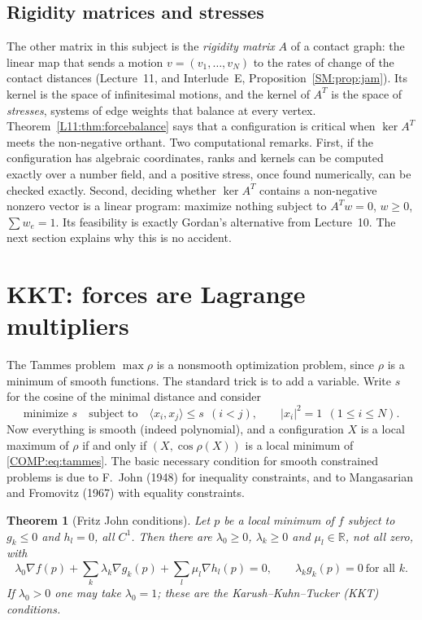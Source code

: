 \documentclass[11pt,openany]{book}
\theoremstyle{plain}
\newtheorem{theorem}{Theorem}[chapter]
\theoremstyle{definition}
\theoremstyle{remark}
\newcommand{\R}{\mathbb{R}}
\newcommand{\abs}[1]{\left\lvert #1 \right\rvert}
\newcommand{\ip}[2]{\langle #1, #2\rangle}
\begin{document}
\subsection{Rigidity matrices and stresses}
The other matrix in this subject is the \emph{rigidity matrix} $A$ of a contact graph: the linear map that
sends a motion $v=(v_1,\dots,v_N)$ to the rates of change of the contact distances (Lecture~11, and
Interlude~E, Proposition~\ref{SM:prop:jam}). Its kernel is the space of infinitesimal motions, and the
kernel of $A^T$ is the space of \emph{stresses}, systems of edge weights that balance at every vertex.
Theorem~\ref{L11:thm:forcebalance} says that a configuration is critical when $\ker A^T$ meets the
non-negative orthant. Two computational remarks. First, if the configuration has algebraic coordinates,
ranks and kernels can be computed exactly over a number field, and a positive stress, once found
numerically, can be checked exactly. Second, deciding whether $\ker A^T$ contains a non-negative nonzero
vector is a linear program: maximize nothing subject to $A^Tw=0$, $w\ge0$, $\sum w_e=1$. Its feasibility
is exactly Gordan's alternative from Lecture~10. The next section explains why this is no accident.

\section{KKT: forces are Lagrange multipliers}
\label{COMP:sec:kkt}

The Tammes problem $\max\rho$ is a nonsmooth optimization problem, since $\rho$ is a minimum of smooth
functions. The standard trick is to add a variable. Write $s$ for the cosine of the minimal distance and
consider
\begin{equation}\label{COMP:eq:tammes}
  \text{minimize } s\quad\text{subject to}\quad \ip{x_i}{x_j}\le s\ \ (i<j),\qquad \abs{x_i}^2=1\ \ (1\le i\le N).
\end{equation}
Now everything is smooth (indeed polynomial), and a configuration $X$ is a local maximum of $\rho$ if and
only if $(X,\cos\rho(X))$ is a local minimum of \eqref{COMP:eq:tammes}. The basic necessary condition for
smooth constrained problems is due to F.~John (1948) for inequality constraints, and to Mangasarian and
Fromovitz (1967) with equality constraints.

\begin{theorem}[Fritz John conditions]
Let $p$ be a local minimum of $f$ subject to $g_k\le0$ and $h_l=0$, all $C^1$. Then there are
$\lambda_0\ge0$, $\lambda_k\ge0$ and $\mu_l\in\R$, not all zero, with
\[
  \lambda_0\nabla f(p)+\sum_k\lambda_k\nabla g_k(p)+\sum_l\mu_l\nabla h_l(p)=0,\qquad \lambda_kg_k(p)=0\ \text{for all }k.
\]
If $\lambda_0>0$ one may take $\lambda_0=1$; these are the \emph{Karush--Kuhn--Tucker (KKT)} conditions.
\end{theorem}
\end{document}
